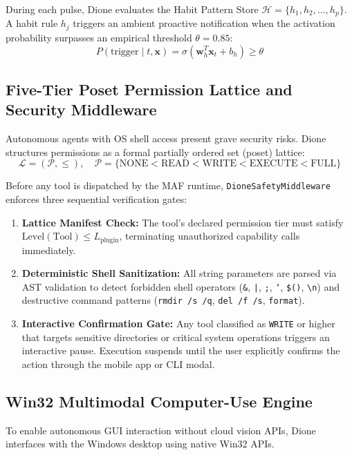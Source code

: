 \documentclass[conference,a4paper]{IEEEtran}
\begin{document}
During each pulse, Dione evaluates the Habit Pattern Store $\mathcal{H} = \{h_1, h_2, \dots, h_p\}$. A habit rule $h_j$ triggers an ambient proactive notification when the activation probability surpasses an empirical threshold $\theta = 0.85$:
\begin{equation}
P(\text{trigger} \mid t, \mathbf{x}) = \sigma\left(\mathbf{w}_h^T \mathbf{x}_t + b_h\right) \ge \theta
\end{equation}

\subsection{Five-Tier Poset Permission Lattice and Security Middleware}
Autonomous agents with OS shell access present grave security risks. Dione structures permissions as a formal partially ordered set (poset) lattice:
\begin{equation}
\mathcal{L} = (\mathcal{P}, \le), \quad \mathcal{P} = \{\text{NONE} < \text{READ} < \text{WRITE} < \text{EXECUTE} < \text{FULL}\}
\end{equation}

Before any tool is dispatched by the MAF runtime, \texttt{DioneSafetyMiddleware} enforces three sequential verification gates:
\begin{enumerate}
    \item \textbf{Lattice Manifest Check:} The tool's declared permission tier must satisfy $\text{Level}(\text{Tool}) \le L_{\text{plugin}}$, terminating unauthorized capability calls immediately.
    \item \textbf{Deterministic Shell Sanitization:} All string parameters are parsed via AST validation to detect forbidden shell operators (\texttt{\&}, \texttt{|}, \texttt{;}, \texttt{`}, \texttt{\$()}, \texttt{\textbackslash n}) and destructive command patterns (\texttt{rmdir /s /q}, \texttt{del /f /s}, \texttt{format}).
    \item \textbf{Interactive Confirmation Gate:} Any tool classified as \texttt{WRITE} or higher that targets sensitive directories or critical system operations triggers an interactive pause. Execution suspends until the user explicitly confirms the action through the mobile app or CLI modal.
\end{enumerate}

\subsection{Win32 Multimodal Computer-Use Engine}
To enable autonomous GUI interaction without cloud vision APIs, Dione interfaces with the Windows desktop using native Win32 APIs.
\end{document}
